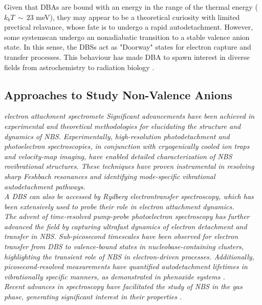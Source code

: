Given that DBAs are bound with an energy in the range of the thermal energy ($k_bT\,\sim\,23$ meV), they may appear to be a theoretical curiosity with limited prectical relavance, whose fate is to undergo a rapid autodetachment. However, some systemscan undergo an nonadiabatic transition to a stable valence anion state\cite{herbert2015quantum,jordan2003theory}. In this sense, the DBSs act as "Doorway" states for electron capture and transfer processes\cite{sommerfeld2002coupling,jordan2003theory,kang2024reaction}. This behaviour has made DBA to spawn interest in diverse fields from astrochemistry \cite{fortenberry2015interstellar} to radiation biology \cite{narayanan2023secondary,sedmidubska2024interaction}.

\subsection{Approaches to Study Non-Valence Anions}
\textit{
  electron attachment spectromete
  Significant advancements have been achieved in experimental and theoretical methodologies for elucidating the structure and dynamics of NBS. Experimentally, high-resolution photodetachment and photoelectron spectroscopies, in conjunction with cryogenically cooled ion traps and velocity-map imaging, have enabled detailed characterization of NBS rovibrational structures. These techniques have proven instrumental in resolving sharp Feshbach resonances and identifying mode-specific vibrational autodetachment pathways.\\A DBS can also be accessed by Rydberg electrontransfer spectroscopy, which has been extensively used to probe their role in electron attachment dynamics.\\The advent of time-resolved pump-probe photoelectron spectroscopy has further advanced the field by capturing ultrafast dynamics of electron detachment and transfer in NBS. Sub-picosecond timescales have been observed for electron transfer from DBS to valence-bound states in nucleobase-containing clusters, highlighting the transient role of NBS in electron-driven processes. Additionally, picosecond-resolved measurements have quantified autodetachment lifetimes in vibrationally specific manners, as demonstrated in phenoxide systems \cite{jordan2003theory,paran2024performance}.\\Recent advances in spectroscopy have facilitated the study of NBS in the gas phase, generating significant interest in their properties \cite{kang2024reaction}.} 

